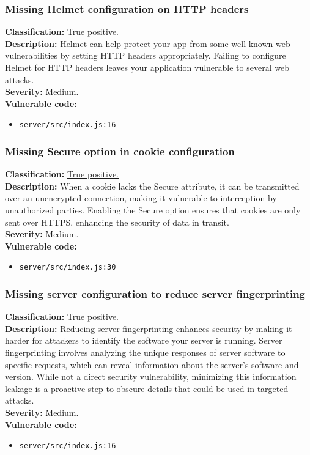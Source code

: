 \documentclass[]{article}
\begin{document}
\subsubsection{Missing Helmet configuration on HTTP headers}
\textbf{Classification:} True positive. \\
\textbf{Description:} Helmet can help protect your app from some well-known web vulnerabilities by setting HTTP headers appropriately. Failing to configure Helmet for HTTP headers leaves your application vulnerable to several web attacks. \\ 
\textbf{Severity:} Medium. \\ 
\textbf{Vulnerable code:}
\begin{itemize}
    \item \texttt{server/src/index.js:16}
\end{itemize}

\subsubsection{Missing Secure option in cookie configuration}
\textbf{Classification:} \hyperref[subsubsec:sensitive_cookie_without_secure_and_httponly_attributes]{True positive.} \\
\textbf{Description:} When a cookie lacks the Secure attribute, it can be transmitted over an unencrypted connection, making it vulnerable to interception by unauthorized parties. Enabling the Secure option ensures that cookies are only sent over HTTPS, enhancing the security of data in transit. \\ 
\textbf{Severity:} Medium. \\ 
\textbf{Vulnerable code:}
\begin{itemize}
    \item \texttt{server/src/index.js:30}
\end{itemize}

\subsubsection{Missing server configuration to reduce server fingerprinting}
\textbf{Classification:} True positive. \\
\textbf{Description:} Reducing server fingerprinting enhances security by making it harder for attackers to identify the software your server is running. Server fingerprinting involves analyzing the unique responses of server software to specific requests, which can reveal information about the server's software and version. While not a direct security vulnerability, minimizing this information leakage is a proactive step to obscure details that could be used in targeted attacks. \\ 
\textbf{Severity:} Medium. \\ 
\textbf{Vulnerable code:}
\begin{itemize}
    \item \texttt{server/src/index.js:16}
\end{itemize}
\end{document}
